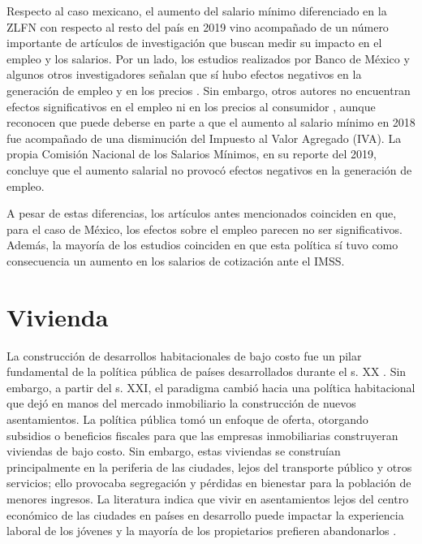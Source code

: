 Respecto al caso mexicano, el aumento del salario mínimo diferenciado en la ZLFN con respecto al resto del país en 2019 vino acompañado de un número importante de artículos de investigación que buscan medir su impacto en el empleo y los salarios. Por un lado, los estudios realizados por Banco de México y algunos otros investigadores señalan que sí hubo efectos negativos en la generación de empleo \citep{banxico2020} y en los precios \citep{banxico2020, calderon2020}. Sin embargo, otros autores no encuentran efectos significativos en el empleo \citep{campos-vazquez_delgado_rodas_2020} ni en los precios al consumidor \citep{campos-vazquez_esquivel_2020}, aunque reconocen que puede deberse en parte a que el aumento al salario mínimo en 2018 fue acompañado de una disminución del Impuesto al Valor Agregado (IVA). La propia Comisión Nacional de los Salarios Mínimos, en su reporte del 2019, concluye que el aumento salarial no provocó efectos negativos en la generación de empleo.


A pesar de estas diferencias, los artículos antes mencionados coinciden en que, para el caso de México, los efectos sobre el empleo parecen no ser significativos. Además, la mayoría de los estudios coinciden en que esta política sí tuvo como consecuencia un aumento en los salarios de cotización ante el IMSS. 


\section{Vivienda}

\noindent La construcción de desarrollos habitacionales de bajo costo fue un pilar fundamental de la política pública de países desarrollados durante el s. XX \citep{monkkonen_2011}. Sin embargo, a partir del s. XXI, el paradigma cambió hacia una política habitacional que dejó en manos del mercado inmobiliario la construcción de nuevos asentamientos. La política pública tomó un enfoque de oferta, otorgando subsidios o beneficios fiscales para que las empresas inmobiliarias construyeran viviendas de bajo costo. Sin embargo, estas viviendas se construían principalmente en la periferia de las ciudades, lejos del transporte público y otros servicios; ello provocaba  segregación y pérdidas en bienestar para la población de menores ingresos. La literatura indica que vivir en asentamientos lejos del centro económico de las ciudades en países en desarrollo puede impactar la experiencia laboral de los jóvenes \citep{franklin_2018,kain_1992} y la mayoría de los propietarios prefieren abandonarlos \citep{barnhardt_2017}. 

